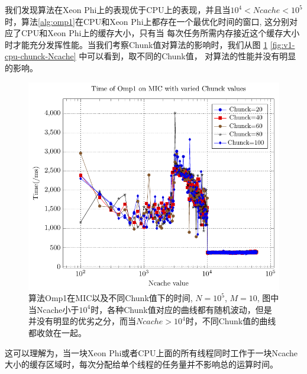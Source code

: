 我们发现算法在Xeon Phi上的表现优于CPU上的表现，并且当$10^4 < Ncache < 10^5$时，算法\ref{alg:omp1}在CPU和Xeon Phi上都存在一个最优化时间的窗口, 
这分别对应了CPU和Xeon Phi上的缓存大小，只有当
每次任务所需内存接近这个缓存大小时才能充分发挥性能。当我们考察Chunk值对算法的影响时，我们从图
\ref{fig:v1-mic-chunck-Ncache} \ref{fig:v1-cpu-chunck-Ncache} 中可以看到，取不同的Chunk值，
对算法的性能并没有明显的影响。
\begin{figure}[!t]
   \centering
   \includegraphics[width=\textwidth]{chap5/Figures/bsV1-mic-Time-Chunck.pdf}
   \caption{算法Omp1在MIC以及不同Chunk值下的时间, $N=10^5$, $M=10$, 图中当Ncache小于$10^4$时，各种Chunk值对应的曲线都有随机波动，但是
   并没有明显的优劣之分，而当$Ncache > 10^4$时，不同Chunk值的曲线都收敛在一起。}
   \label{fig:v1-mic-chunck-Ncache}
\end{figure}
这可以理解为，当一块Xeon Phi或者CPU上面的所有线程同时工作于一块Ncache大小的缓存区域时，每次分配给单个线程的任务量并不影响总的运算时间。
